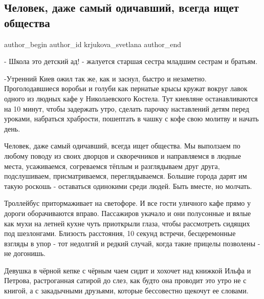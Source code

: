 
 
 
 
 
 
\subsection{Человек, даже самый одичавший, всегда ищет общества}
\label{sec:13_09_2021.fb.krjukova_svetlana.1.chelovek_deti_kiev}
 
\ifcmt
 author_begin
   author_id krjukova_svetlana
 author_end
\fi

- Школа это детский ад! - жалуется старшая сестра младшим сестрам и братьям.

-Утренний Киев ожил так же, как и заснул, быстро и незаметно. Проголодавшиеся
воробьи и голуби как пернатые крысы кружат вокруг лавок одного из людных кафе у
 Николаевского Костела. Тут киевляне останавливаются на 10 минут, чтобы
задержать утро, сделать парочку наставлений детям перед уроками, набраться
храбрости, пошептать в чашку с кофе свою молитву и начать день. 

Человек, даже самый одичавший, всегда ищет общества. Мы выползаем по любому
поводу из своих дворцов и скворечников и направляемся в людные места,
усаживаемся, согреваемся тёплым и разглядываем друг друга, подслушиваем,
присматриваемся, переглядываемся. Большие города дарят им такую роскошь -
оставаться одинокими среди людей. Быть вместе, но молчать. 

Троллейбус притормаживает на светофоре. И все гости уличного кафе прямо у
дороги оборачиваются вправо. Пассажиров укачало и они полусонные и вялые как
мухи на летней кухне чуть приоткрыли глаза, чтобы рассмотреть сидящих под
шезлонгами. Близость расстояния, 10 секунд встречи, бесцеремонные взгляды в
упор - тот недолгий и редкий случай, когда такие прицелы позволены - не
догонишь.

Девушка в чёрной кепке с чёрным чаем сидит и хохочет над книжкой Ильфа и
Петрова, растроганная сатирой до слез, как будто она проводит это утро не с
книгой, а с закадычными друзьями, которые бессовестно щекочут ее словами.

